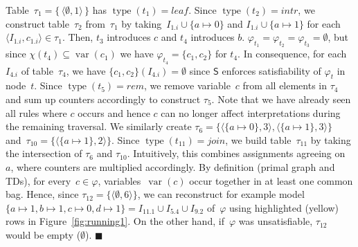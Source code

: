 \documentclass{llncs}
\newcommand{\SB}{\{\,}%
\newcommand{\SE}{\,\}}%
\newcommand{\algo}[1]{\ensuremath{\mathsf{#1}}}
\newcommand{\tab}[1]{\ensuremath{\tau_{#1}}}
\DeclareMathOperator{\var}{var}
\DeclareMathOperator{\type}{type}
\newcommand{\intr}{\textit{intr}}
\newcommand{\leaf}{\textit{leaf}}
\newcommand{\rem}{\textit{rem}}
\newcommand{\join}{\textit{join}}
\renewenvironment{example}{\begin{EXa}}{\hfill\ensuremath{\blacksquare}\end{EXa}}
\begin{document}
\begin{example}
  Table~$\tab{1}=\SB \langle\emptyset, 1\rangle \SE$ has
  $\type(t_1) = \leaf$.
  Since $\type(t_2) = \intr$, we construct table~$\tab{2}$
  from~$\tab{1}$ by taking~$I_{1.i}\cup\{a\mapsto 0\}$ and $I_{1.i}\cup \{a \mapsto 1\}$ for
  each~$\langle I_{1.i}, c_{1.i}\rangle \in \tab{1}$. Then,
  $t_3$ introduces $c$ and $t_4$ introduces $b$.
  $\varphi_{t_1}=\varphi_{t_2}=\varphi_{t_3} = \emptyset$, but since
  $\chi(t_4) \subseteq \var(c_1)$ we have
  $\varphi_{t_4} = \{c_1,c_2\}$ for $t_4$.
  In consequence, for each~$I_{4.i}$ of table~$\tab{4}$, we have
  $\{c_1,c_2\}({{I_{4.i}}})=\emptyset$ since \algo{S} enforces
  satisfiability of $\varphi_t$ in node~$t$.  
  Since $\type(t_5) = \rem$, we remove variable~$c$ from all
  elements in $\tab{4}$ and sum up counters accordingly to construct $\tab{5}$. 
  Note that we have
  already seen all rules where $c$ occurs and hence $c$ can no
  longer affect interpretations during the remaining traversal. We
  similarly create $\tab{6}=\{\langle \{a\mapsto 0\}, 3 \rangle, \langle \{a \mapsto 1\}, 3 \rangle\}$
  and~$\tab{{10}}=\{\langle \{a \mapsto 1\}, 2 \rangle\}$.
  Since $\type(t_{11})=\join$, we build table~$\tab{11}$ by taking
  the intersection of $\tab{6}$ and $\tab{{10}}$. Intuitively, this
  combines assignments agreeing on~$a$, where counters are multiplied accordingly.
  By definition (primal graph and TDs), for every~$c \in \varphi$,
  variables~$\var(c)$ occur together in at least one common bag.
  Hence, %
  since
  $\tab{12} = \{\langle \emptyset, 6 \rangle \}$, we can reconstruct for example
  model~$\{a\mapsto 1,b \mapsto 1, c\mapsto 0, d\mapsto 1\} = I_{11.1} \cup I_{5.4} \cup I_{9.2}$ of~$\varphi$ using highlighted (yellow) rows in Figure~\ref{fig:running1}.
  On the other hand, if~$\varphi$ was unsatisfiable, $\tab{12}$ would be empty ($\emptyset$). %
%
%
%
\end{example}%
\end{document}
